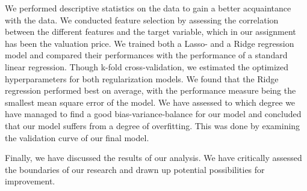 \documentclass[12pt,a4paper]{article}
\begin{document}
We performed descriptive statistics on the data to gain a better acquaintance with the data. 
We conducted feature selection by assessing the correlation between the different features and the target variable, which in our assignment has been the valuation price. 
We trained both a Lasso- and a Ridge regression model and compared their performances with the performance of a standard linear regression. Though k-fold cross-validation, we estimated the optimized hyperparameters for both regularization models. We found that the Ridge regression performed best on average, with the performance measure being the smallest mean square error of the model. 
We have assessed to which degree we have managed to find a good bias-variance-balance for our model and concluded that our model suffers from a degree of overfitting. This was done by examining the validation curve of our final model.

Finally, we have discussed the results of our analysis. We have critically assessed the boundaries of our research and drawn up potential possibilities for improvement. 
\end{document}
